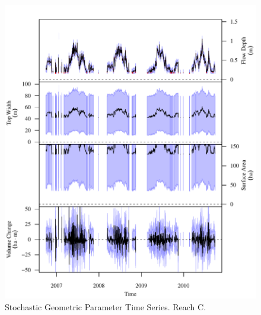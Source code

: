\begin{figure}[htbp]
\begin{center}
	\includegraphics[width=5.5in]{"Figures/Results_USR/G TS C"}
	\caption{Stochastic Geometric Parameter Time Series.  Reach C.}
\end{center}
\end{figure}
\newpage

